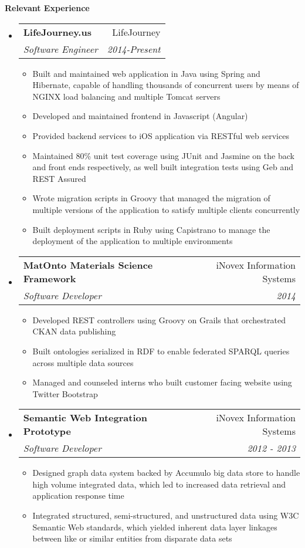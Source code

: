 \documentclass[letterpaper,11pt]{article}
\makeatletter
\newcommand{\resitem}[1]{\item #1 \vspace{-2pt}}
\newcommand{\resheading}[1]{{\large \colorbox{mygrey}{\begin{minipage}{\textwidth}{\textbf{#1 \vphantom{p\^{E}}}}\end{minipage}}}}
\newcommand{\ressubheading}[4]{
\begin{tabular*}{7.0in}{l@{\extracolsep{\fill}}r}
		\textbf{#1} & #2 \\
		\textit{#3} & \textit{#4} \\
\end{tabular*}\vspace{-6pt}}
\makeatother
\begin{document}
\resheading{Relevant Experience}
\begin{itemize}
	\item
	\ressubheading{LifeJourney.us}{LifeJourney}{Software Engineer}{2014-Present}
	\begin{itemize}
		\resitem{Built and maintained web application in Java using Spring and Hibernate, capable of handling thousands of concurrent users by means of NGINX load balancing and multiple Tomcat servers}
		\resitem{Developed and maintained frontend in Javascript (Angular)}
		\resitem{Provided backend services to iOS application via RESTful web services}
		\resitem{Maintained 80\% unit test coverage using JUnit and Jasmine on the back and front ends respectively, as well built integration tests using Geb and REST Assured}
		\resitem{Wrote migration scripts in Groovy that managed the migration of multiple versions of the application to satisfy multiple clients concurrently}
		\resitem{Built deployment scripts in Ruby using Capistrano to manage the deployment of the application to multiple environments}
	\end{itemize}

	\item
	\ressubheading{MatOnto Materials Science Framework}{iNovex Information Systems}{Software Developer}{2014}
	\begin{itemize}
		\resitem{Developed REST controllers using Groovy on Grails that orchestrated CKAN data publishing}
		\resitem{Built ontologies serialized in RDF to enable federated SPARQL queries across multiple data sources}
		\resitem{Managed and counseled interns who built customer facing website using Twitter Bootstrap}
	\end{itemize}

	\item
	\ressubheading{Semantic Web Integration Prototype}{iNovex Information Systems}{Software Developer}{2012 - 2013}
	\begin{itemize}
		\resitem{Designed graph data system backed by Accumulo big data store to handle high volume integrated data, which led to increased data retrieval and application response time}
		\resitem{Integrated structured, semi-structured, and unstructured data using W3C Semantic Web standards, which yielded inherent data layer linkages between like or similar entities from disparate data sets}
	\end{itemize}

\end{itemize}
\end{document}
